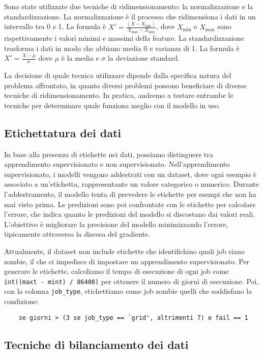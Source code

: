Sono state utilizzate due tecniche di ridimensionamento: la normalizzazione e
la standardizzazione. La normalizzazione è il processo che ridimensiona i dati
in un intervallo tra 0 e 1. La formula è
$X'=\frac{(X-X_{\min})}{X_{\max}-X_{\min}}$, dove $X_{\min}$ e $X_{\max}$ sono
rispettivamente i valori minimi e massimi della feature. La standardizzazione
trasforma i dati in modo che abbiano media 0 e varianza di 1. La formula è
$X'=\frac{X-\mu}{\sigma}$ dove $\mu$ è la media e $\sigma$ la deviazione
standard.

La decisione di quale tecnica utilizzare dipende dalla specifica natura del
problema affrontato, in quanto diversi problemi possono beneficiare di diverse
tecniche di ridimensionamento. In pratica, andremo a testare entrambe le
tecniche per determinare quale funziona meglio con il modello in uso.

\subsection{Etichettatura dei dati}

In base alla presenza di etichette nei dati, possiamo distinguere tra
apprendimento supervisionato e non supervisionato. Nell'apprendimento
supervisionato, i modelli vengono addestrati con un dataset, dove ogni esempio
è associato a un'etichetta, rappresentante un valore categorico o numerico.
Durante l'addestramento, il modello tenta di prevedere le etichette per esempi
che non ha mai visto prima. Le predizioni sono poi confrontate con le
etichette per calcolare l'errore, che indica quanto le predizioni del modello
si discostano dai valori reali. L'obiettivo è migliorare la precisione del
modello minimizzando l'errore, tipicamente attraverso la discesa del
gradiente.

Attualmente, il dataset non include etichette che identifichino quali job
siano zombie, il che ci impedisce di impostare un apprendimento
supervisionato. Per generare le etichette, calcoliamo il tempo di esecuzione
di ogni job come \verb|int((maxt - mint) / 86400)| per ottenere il numero
di giorni di esecuzione. Poi, con la colonna \texttt{job\_type}, etichettiamo
come job zombie quelli che soddisfano la condizione:

\begin{verbatim}
    se giorni > (3 se job_type == `grid', altrimenti 7) e fail == 1 
\end{verbatim}

\subsection{Tecniche di bilanciamento dei dati}
\label{sec:imbalanced_data}


